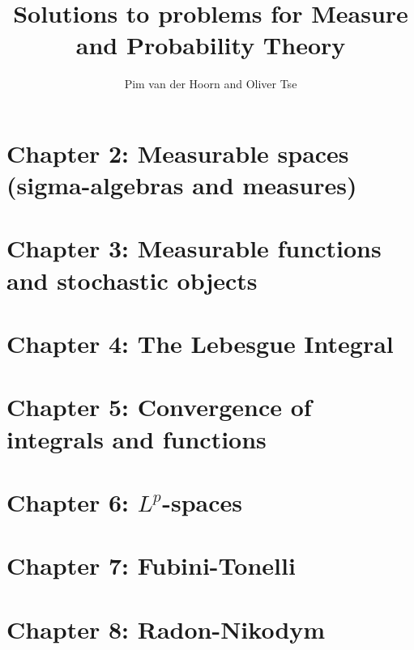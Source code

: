 \documentclass{lecturenotes}
\begin{document}
\begin{titlepage}
    \title{Solutions to problems for Measure and Probability Theory}
    \author{Pim van der Hoorn and Oliver Tse}
    \maketitle
\end{titlepage}


\section*{Chapter 2: Measurable spaces (sigma-algebras and measures)}



\section*{Chapter 3: Measurable functions and stochastic objects}



\section*{Chapter 4: The Lebesgue Integral}


\section*{Chapter 5: Convergence of integrals and functions}


\section*{Chapter 6: $L^p$-spaces}


\section*{Chapter 7: Fubini-Tonelli}


\section*{Chapter 8: Radon-Nikodym}

\end{document}
